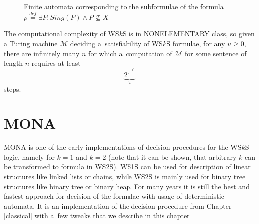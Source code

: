 \begin{figure}[h!]
\begin{center}
 \end{center}
 \caption{Finite automata corresponding to the subformulae of the formula
 $\rho \overset{\mathit{def}}{=} \exists P:
 Sing(P) \wedge P \not\subseteq X$}\label{automata}
\end{figure}
   \noindent\hrulefill

The computational complexity of WS$k$S is in NONELEMENTARY class, so given
a Turing machine $\mathcal{M}$ deciding a~satisfiability of WS$k$S formulae, for
any $u \geq 0$, there are infinitely many $n$ for which a~computation of
$\mathcal{M}$ for some sentence of length $n$ requires at least
$$\underbrace{2^{2^{\iddots^{2^n}}}}_u$$ steps.
	
\chapter{\textsc{MONA}}\label{monachap}

 \textsc{MONA} \cite{mona} is one of the early implementations of decision
 procedures for the WS$k$S logic, namely for $k = 1$ and $k = 2$ (note that it
 can be shown, that arbitrary $k$ can be transformed to formula in WS2S). WS1S
 can be used for description of linear structures like linked lists or chains,
 while WS2S is mainly used for binary tree structures like binary tree or binary
 heap. For many years it is still the best and fastest approach for decision of
 the formulae with usage of deterministic automata. It is an implementation of
 the decision procedure from Chapter \ref{classical} with a~few tweaks that we
 describe in this chapter

